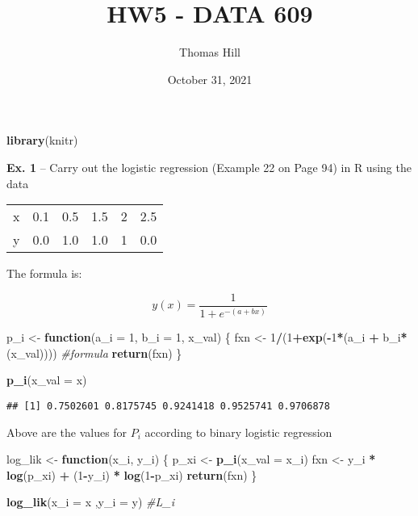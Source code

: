 \documentclass[
]{article}
\title{HW5 - DATA 609}
\author{Thomas Hill}
\date{October 31, 2021}
\newenvironment{Shaded}{\begin{snugshade}}{\end{snugshade}}
\newcommand{\CommentTok}[1]{\textcolor[rgb]{0.56,0.35,0.01}{\textit{#1}}}
\newcommand{\ControlFlowTok}[1]{\textcolor[rgb]{0.13,0.29,0.53}{\textbf{#1}}}
\newcommand{\DataTypeTok}[1]{\textcolor[rgb]{0.13,0.29,0.53}{#1}}
\newcommand{\DecValTok}[1]{\textcolor[rgb]{0.00,0.00,0.81}{#1}}
\newcommand{\KeywordTok}[1]{\textcolor[rgb]{0.13,0.29,0.53}{\textbf{#1}}}
\newcommand{\NormalTok}[1]{#1}
\newcommand{\OperatorTok}[1]{\textcolor[rgb]{0.81,0.36,0.00}{\textbf{#1}}}
\newcommand{\StringTok}[1]{\textcolor[rgb]{0.31,0.60,0.02}{#1}}
\begin{document}
\maketitle

\begin{Shaded}
\begin{Highlighting}[]
\KeywordTok{library}\NormalTok{(knitr)}
\end{Highlighting}
\end{Shaded}

\textbf{Ex. 1} -- Carry out the logistic regression (Example 22 on Page
94) in R using the data

\begin{longtable}[]{@{}lrrrrr@{}}
\toprule
\endhead
x & 0.1 & 0.5 & 1.5 & 2 & 2.5\tabularnewline
y & 0.0 & 1.0 & 1.0 & 1 & 0.0\tabularnewline
\bottomrule
\end{longtable}

The formula is:

\[y(x) = \frac{1}{1 + e^{-(a+bx)}}\]

\begin{Shaded}
\begin{Highlighting}[]
\NormalTok{p\_i \textless{}{-}}\StringTok{ }\ControlFlowTok{function}\NormalTok{(}\DataTypeTok{a\_i =} \DecValTok{1}\NormalTok{, }\DataTypeTok{b\_i =} \DecValTok{1}\NormalTok{, x\_val) \{}
\NormalTok{  fxn \textless{}{-}}\StringTok{ }\DecValTok{1}\OperatorTok{/}\NormalTok{(}\DecValTok{1}\OperatorTok{+}\KeywordTok{exp}\NormalTok{(}\OperatorTok{{-}}\DecValTok{1}\OperatorTok{*}\NormalTok{(a\_i }\OperatorTok{+}\StringTok{ }\NormalTok{b\_i}\OperatorTok{*}\NormalTok{(x\_val)))) }\CommentTok{\#formula}
  \KeywordTok{return}\NormalTok{(fxn)}
\NormalTok{\}}

\KeywordTok{p\_i}\NormalTok{(}\DataTypeTok{x\_val =}\NormalTok{ x)}
\end{Highlighting}
\end{Shaded}

\begin{verbatim}
## [1] 0.7502601 0.8175745 0.9241418 0.9525741 0.9706878
\end{verbatim}

Above are the values for \(P_i\) according to binary logistic regression

\begin{Shaded}
\begin{Highlighting}[]
\NormalTok{log\_lik \textless{}{-}}\StringTok{ }\ControlFlowTok{function}\NormalTok{(x\_i, y\_i) \{}
\NormalTok{  p\_xi \textless{}{-}}\StringTok{ }\KeywordTok{p\_i}\NormalTok{(}\DataTypeTok{x\_val =}\NormalTok{ x\_i)}
\NormalTok{  fxn \textless{}{-}}\StringTok{ }\NormalTok{y\_i }\OperatorTok{*}\StringTok{ }\KeywordTok{log}\NormalTok{(p\_xi) }\OperatorTok{+}\StringTok{ }\NormalTok{(}\DecValTok{1}\OperatorTok{{-}}\NormalTok{y\_i) }\OperatorTok{*}\StringTok{ }\KeywordTok{log}\NormalTok{(}\DecValTok{1}\OperatorTok{{-}}\NormalTok{p\_xi)}
  \KeywordTok{return}\NormalTok{(fxn)}
\NormalTok{\}}

\KeywordTok{log\_lik}\NormalTok{(}\DataTypeTok{x\_i =}\NormalTok{ x ,}\DataTypeTok{y\_i =}\NormalTok{ y) }\CommentTok{\#L\_i}
\end{Highlighting}
\end{Shaded}
\end{document}

